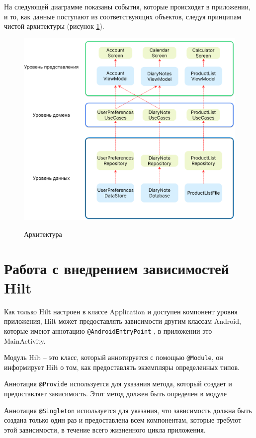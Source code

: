 На следующей диаграмме показаны события, которые происходят в приложении, и то, как данные поступают из соответствующих объектов, следуя принципам чистой архитектуры (рисунок \ref{fig:AppArch}).

\begin{figure}[h!]
    \begin{center}
        \includegraphics[width=0.9\hsize]{fig/AppArch.png}\\[2mm]
        \caption{Архитектура }\label{fig:AppArch}
    \end{center}
\end{figure}


\section{Работа с внедрением зависимостей Hilt}

Как только Hilt настроен в классе Application и доступен компонент уровня приложения, Hilt может предоставлять зависимости другим классам Android, которые имеют аннотацию \verb|@AndroidEntryPoint|
, в приложении это MainActivity.

Модуль Hilt -- это класс, который аннотируется с помощью \verb|@Module|, он информирует Hilt о том, как предоставлять экземпляры определенных типов.

Аннотация \verb|@Provide| используется для указания метода, который создает и предоставляет зависимость. Этот метод должен быть определен в модуле

Аннотация \verb|@Singleton| используется для указания, что зависимость должна быть создана только один раз и предоставлена всем компонентам, которые требуют этой зависимости, в течение всего жизненного цикла приложения.


